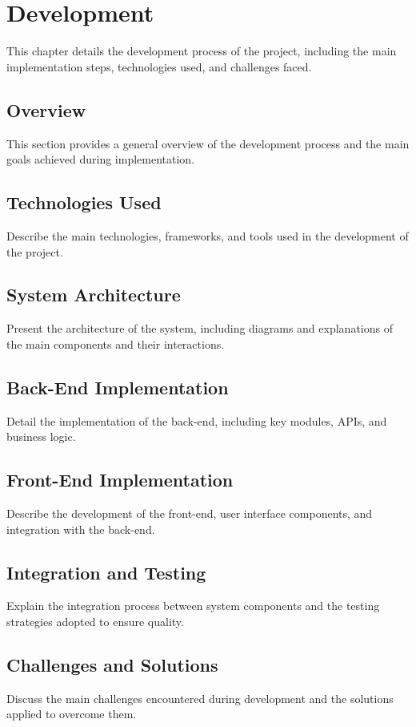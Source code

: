 
\chapter{Development}\label{cap:development}
This chapter details the development process of the project, including the main implementation steps, technologies used, and challenges faced.

\section{Overview}
This section provides a general overview of the development process and the main goals achieved during implementation.

\section{Technologies Used}
Describe the main technologies, frameworks, and tools used in the development of the project.

\section{System Architecture}
Present the architecture of the system, including diagrams and explanations of the main components and their interactions.

\section{Back-End Implementation}
Detail the implementation of the back-end, including key modules, APIs, and business logic.

\section{Front-End Implementation}
Describe the development of the front-end, user interface components, and integration with the back-end.

\section{Integration and Testing}
Explain the integration process between system components and the testing strategies adopted to ensure quality.

\section{Challenges and Solutions}
Discuss the main challenges encountered during development and the solutions applied to overcome them.